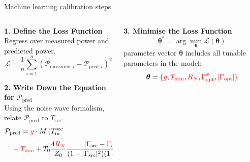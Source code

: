 \documentclass[aspectratio=169]{beamer}
\begin{document}
\begin{frame}{\small{Machine learning calibration steps}}
	\footnotesize
	\begin{columns}
		\begin{column}{0.5\textwidth}
			\textbf{1. Define the Loss Function}\\
			Regress over measured power and predicted power.\\
			\begin{equation}
				\mathcal{L} = \frac{1}{n}\sum_{i=1}^{n} \left( \mathcal{P}_{\text{measured},i} - \mathcal{P}_{\text{pred},i} \right)^{2}
			\end{equation}

			\vspace{0.5cm} %

			\textbf{2. Write Down the Equation for \(\mathcal{P}_{\text{pred}}\)}\\
			Using the noise wave formalism, relate \(\mathcal{P}_{\text{pred}}\) to \(T_{\text{src}}\).
			\begin{align}
				 & \mathcal{P}_{\text{pred}} = \textcolor{red}{g} \cdot M \left( T_{\text{in}}^{\text{src}} \right. \nonumber                                                                                                               \\
				 & \quad + \textcolor{red}{T_{\text{min}}} + T_0 \frac{4\textcolor{red}{R_N}}{Z_0} \frac{|\Gamma_{\text{src}} - \textcolor{red}{\Gamma_{\text{opt}}}|^2}{(1 - |\Gamma_{\text{src}}|^2)(1 + |\Gamma_{\text{opt}}|^2)} \Bigg)
			\end{align}
			\vfill
		\end{column}

		\begin{column}{0.5\textwidth}
			\textbf{3. Minimise the Loss Function}
			\begin{equation}
				\boldsymbol{\theta}^* = \arg\min_{\boldsymbol{\theta}} \mathcal{L}(\boldsymbol{\theta})
			\end{equation}
			parameter vector \(\boldsymbol{\theta}\) includes all tunable parameters in the model:
			\begin{equation}
				\boldsymbol{\theta} = \{ \textcolor{red}{g}, \textcolor{red}{T_{\text{min}}}, \textcolor{red}{R_N}, \textcolor{red}{\Gamma_{\text{opt}}^{\phi}}, \textcolor{red}{|\Gamma_{\text{opt}}|)}
			\end{equation}


\end{column}
\end{columns}
\end{frame}
\end{document}
